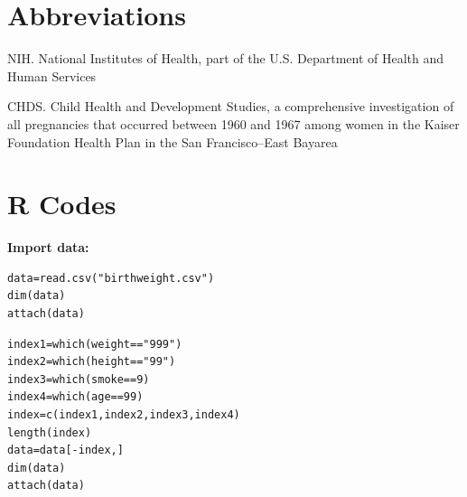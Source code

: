 \documentclass[oneside,12pt]{report}
\begin{document}
%
%
%
%
%
%


\appendix
{}







\chapter{Abbreviations}\label{Abbreviations}


\noindent NIH.  National Institutes of Health, part of the U.S. Department of Health and Human Services

\vspace{5pt}

\noindent CHDS. Child Health and Development Studies, a comprehensive investigation of all pregnancies that occurred between 1960 and 1967 among women in the Kaiser Foundation Health Plan in the San Francisco–East Bayarea

\vspace{5pt}



\chapter{R Codes}\label{R Codes}

{\bf Import data:}
\begin{lstlisting}
data=read.csv("birthweight.csv")
dim(data)
attach(data)
\end{lstlisting}

\begin{lstlisting}
index1=which(weight=="999")
index2=which(height=="99")
index3=which(smoke==9)
index4=which(age==99)
index=c(index1,index2,index3,index4)
length(index)
data=data[-index,]
dim(data)
attach(data)
\end{lstlisting}
\end{document}
